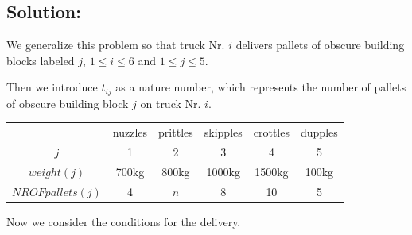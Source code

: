 \documentclass[11pt]{article}
\begin{document}
\vspace{4mm}

\subsection*{Solution:}

We generalize this problem so that truck Nr. $i$ delivers pallets of obscure building blocks labeled $j$, $1\leq i \leq6$ and $1\leq j \leq5$.

Then we introduce $t_{ij}$ as a nature number, which represents the number of pallets of obscure building block $j$ on truck Nr. $i$.
\begin{center}
\begin{tabular}{|c|c|c|c|c|c|}
  \hline
    & nuzzles & prittles & skipples & crottles & dupples \\
  $j$ & 1 & 2 & 3 & 4 & 5 \\
  $weight(j)$ & 700kg & 800kg & 1000kg & 1500kg & 100kg \\
  $NROFpallets(j)$ & 4 & $n$ & 8 & 10 & 5 \\
  \hline
\end{tabular}
\end{center}

Now we consider the conditions for the delivery.
\end{document}
